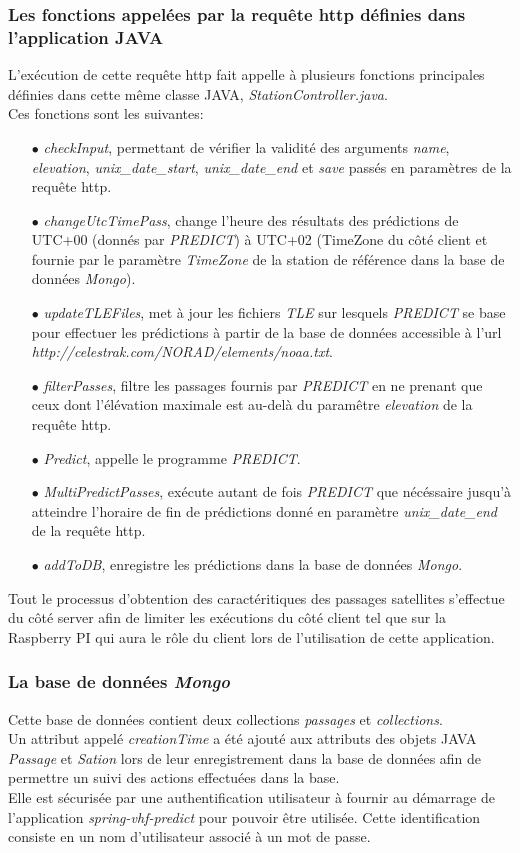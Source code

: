 \documentclass[12pt,fleqn]{book} %
\begin{document}
\subsubsection{Les fonctions appelées par la requête http définies dans l'application JAVA}
\noindent L'exécution de cette requête http fait appelle à plusieurs fonctions principales définies dans cette même classe JAVA, \emph{StationController.java}.
~\\Ces fonctions sont les suivantes:
\begin{itemize}
 \item[$\bullet$] \emph{checkInput}, permettant de vérifier la validité des arguments \emph{name}, \emph{elevation}, \emph{unix\_date\_start}, \emph{unix\_date\_end} et \emph{save} passés en paramètres de la requête http.
 \item[$\bullet$] \emph{changeUtcTimePass}, change l'heure des résultats des prédictions de UTC+00 (donnés par \emph{PREDICT}) à UTC+02 (TimeZone du côté client et fournie par le paramètre \emph{TimeZone} de la station de référence dans la base de données \emph{Mongo}).
 \item[$\bullet$] \emph{updateTLEFiles}, met à jour les fichiers \emph{TLE} sur lesquels \emph{PREDICT} se base pour effectuer les prédictions à partir de la base de données accessible à l'url \emph{http://celestrak.com/NORAD/elements/noaa.txt}.
 \item[$\bullet$] \emph{filterPasses}, filtre les passages fournis par \emph{PREDICT} en ne prenant que ceux dont l'élévation maximale est au-delà du paramêtre \emph{elevation} de la requête http.
 \item[$\bullet$] \emph{Predict}, appelle le programme \emph{PREDICT}.
 \item[$\bullet$] \emph{MultiPredictPasses}, exécute autant de fois \emph{PREDICT} que nécéssaire jusqu'à atteindre l'horaire de fin de prédictions donné en paramètre \emph{unix\_date\_end} de la requête http.
 \item[$\bullet$] \emph{addToDB}, enregistre les prédictions dans la base de données \emph{Mongo}.
 \end{itemize}
Tout le processus d'obtention des caractéritiques des passages satellites s'effectue du côté server afin de limiter les exécutions du côté client tel que sur la Raspberry PI qui aura le rôle du client lors de l'utilisation de cette application.
\subsubsection{La base de données \emph{Mongo}}
\noindent Cette base de données contient deux collections \emph{passages} et \emph{collections}. 
~\\Un attribut appelé \emph{creationTime} a été ajouté aux attributs des objets JAVA \emph{Passage} et \emph{Sation} lors de leur enregistrement dans la base de données afin de permettre un suivi des actions effectuées dans la base. 
~\\Elle est sécurisée par une authentification utilisateur à fournir au démarrage de l'application \emph{spring-vhf-predict} pour pouvoir être utilisée. Cette identification consiste en un nom d'utilisateur associé à un mot de passe. 
\end{document}
